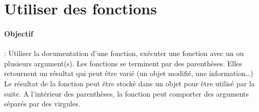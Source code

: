 \section{Utiliser des fonctions}
\paragraph{Objectif} : Utiliser la documentation d'une fonction, exécuter une fonction avec un ou plusieurs argument(s).
Les fonctions se terminent par des parenthèses. Elles retournent un résultat qui peut être varié (un objet modifié, une information…)
Le résultat de la fonction peut être stocké dans un objet pour être utilisé par la suite.
A l'intérieur des parenthèses, la fonction peut comporter des arguments séparés par des virgules.


